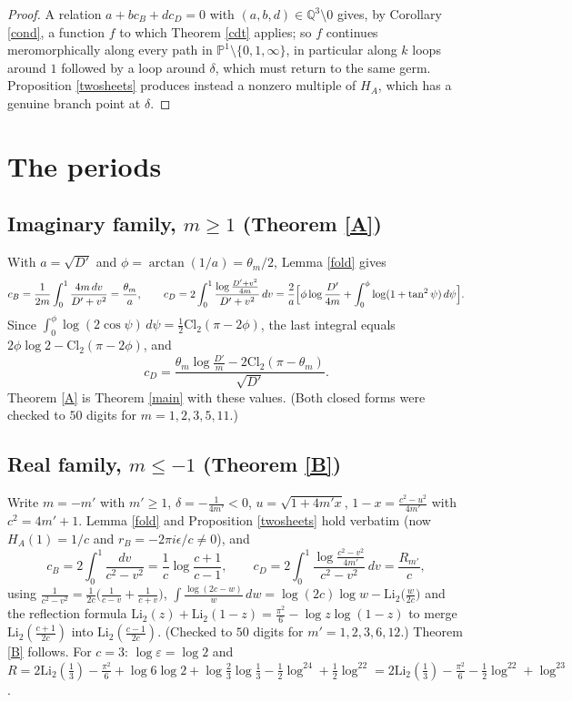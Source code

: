 \documentclass[11pt]{amsart}
\theoremstyle{remark}
\newcommand{\Q}{\mathbb Q}\newcommand{\Z}{\mathbb Z}\newcommand{\R}{\mathbb R}\newcommand{\C}{\mathbb C}
\newcommand{\PP}{\mathbb P}\newcommand{\D}{\mathbb D}\newcommand{\T}{\mathbb T}\newcommand{\Cl}{\mathrm{Cl}_2}\newcommand{\Li}{\mathrm{Li}_2}
\begin{document}
\begin{proof}
A relation $a+bc_B+dc_D=0$ with $(a,b,d)\in\Q^3\setminus0$ gives, by Corollary \ref{cond}, a function $f$ to which Theorem \ref{cdt} applies; so $f$ continues meromorphically along every path in $\PP^1\setminus\{0,1,\infty\}$, in particular along $k$ loops around $1$ followed by a loop around $\delta$, which must return to the same germ. Proposition \ref{twosheets} produces instead a nonzero multiple of $H_A$, which has a genuine branch point at $\delta$.
\end{proof}

\section{The periods}
\subsection{Imaginary family, $m\ge1$ (Theorem \ref{A})}
With $a=\sqrt{D'}$ and $\phi=\arctan(1/a)=\theta_m/2$, Lemma \ref{fold} gives
\[
c_B=\frac1{2m}\int_0^1\frac{4m\,dv}{D'+v^2}=\frac{\theta_m}a,\qquad
c_D=2\int_0^1\frac{\log\frac{D'+v^2}{4m}}{D'+v^2}\,dv=\frac2a\Bigl[\phi\log\frac{D'}{4m}+\int_0^\phi\log(1+\tan^2\psi)\,d\psi\Bigr].
\]
Since $\int_0^\phi\log(2\cos\psi)\,d\psi=\frac12\Cl(\pi-2\phi)$, the last integral equals $2\phi\log2-\Cl(\pi-2\phi)$, and
\[
c_D=\frac{\theta_m\log\frac{D'}m-2\Cl(\pi-\theta_m)}{\sqrt{D'}}.
\]
Theorem \ref{A} is Theorem \ref{main} with these values. (Both closed forms were checked to $50$ digits for $m=1,2,3,5,11$.)

\subsection{Real family, $m\le-1$ (Theorem \ref{B})}
Write $m=-m'$ with $m'\ge1$, $\delta=-\frac1{4m'}<0$, $u=\sqrt{1+4m'x}$, $1-x=\frac{c^2-u^2}{4m'}$ with $c^2=4m'+1$. Lemma \ref{fold} and Proposition \ref{twosheets} hold verbatim (now $H_A(1)=1/c$ and $r_B=-2\pi i\epsilon/c\ne0$), and
\[
c_B=2\int_0^1\frac{dv}{c^2-v^2}=\frac1c\log\frac{c+1}{c-1},\qquad
c_D=2\int_0^1\frac{\log\frac{c^2-v^2}{4m'}}{c^2-v^2}\,dv=\frac{R_{m'}}c ,
\]
using $\frac1{c^2-v^2}=\frac1{2c}\bigl(\frac1{c-v}+\frac1{c+v}\bigr)$, $\int\frac{\log(2c-w)}w\,dw=\log(2c)\log w-\Li\bigl(\frac w{2c}\bigr)$ and the reflection formula $\Li(z)+\Li(1-z)=\frac{\pi^2}6-\log z\log(1-z)$ to merge $\Li(\frac{c+1}{2c})$ into $\Li(\frac{c-1}{2c})$. (Checked to $50$ digits for $m'=1,2,3,6,12$.) Theorem \ref{B} follows. For $c=3$: $\log\varepsilon=\log2$ and $R=2\Li(\frac13)-\frac{\pi^2}6+\log6\log2+\log\frac23\log\frac13-\frac12\log^24+\frac12\log^22=2\Li(\frac13)-\frac{\pi^2}6-\frac12\log^22+\log^23$.
\end{document}
